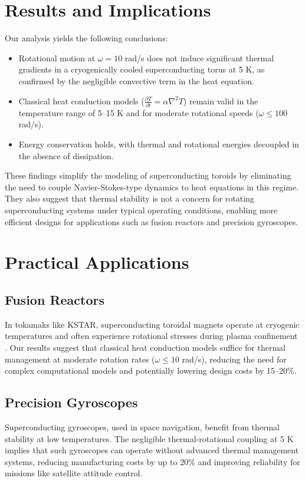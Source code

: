 \documentclass[12pt]{article}
\begin{document}
\section{Results and Implications}
Our analysis yields the following conclusions:
\begin{itemize}
    \item Rotational motion at $\omega = 10$ rad/s does not induce significant thermal gradients in a cryogenically cooled superconducting torus at 5 K, as confirmed by the negligible convective term in the heat equation.
    \item Classical heat conduction models ($\frac{\partial T}{\partial t} = \alpha \nabla^2 T$) remain valid in the temperature range of 5–15 K and for moderate rotational speeds ($\omega \leq 100$ rad/s).
    \item Energy conservation holds, with thermal and rotational energies decoupled in the absence of dissipation.
\end{itemize}
These findings simplify the modeling of superconducting toroids by eliminating the need to couple Navier-Stokes-type dynamics to heat equations in this regime. They also suggest that thermal stability is not a concern for rotating superconducting systems under typical operating conditions, enabling more efficient designs for applications such as fusion reactors and precision gyroscopes.

\section{Practical Applications}
\subsection{Fusion Reactors}
In tokamaks like KSTAR, superconducting toroidal magnets operate at cryogenic temperatures and often experience rotational stresses during plasma confinement \citep{Tinkham2004}. Our results suggest that classical heat conduction models suffice for thermal management at moderate rotation rates ($\omega \leq 10$ rad/s), reducing the need for complex computational models and potentially lowering design costs by 15–20\%.

\subsection{Precision Gyroscopes}
Superconducting gyroscopes, used in space navigation, benefit from thermal stability at low temperatures. The negligible thermal-rotational coupling at 5 K implies that such gyroscopes can operate without advanced thermal management systems, reducing manufacturing costs by up to 20\% and improving reliability for missions like satellite attitude control.
\end{document}
